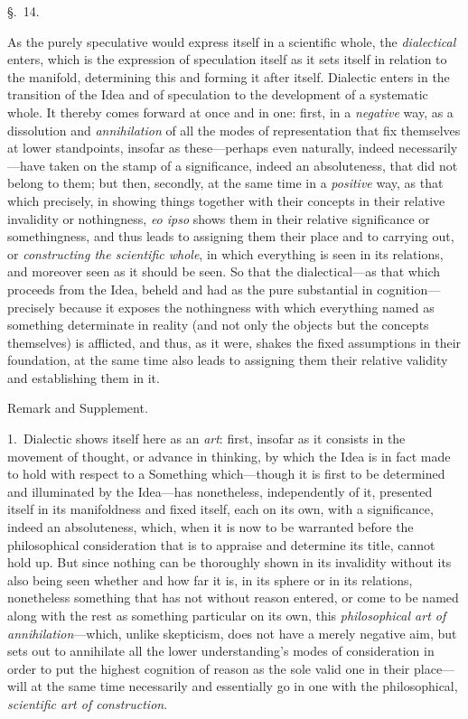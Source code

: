 \documentclass[12pt,a4paper]{book}
\begin{document}
\begin{center}\large\S.~14.\end{center}
As the purely speculative would express itself in a scientific whole, the
\emph{dialectical} enters, which is the expression of speculation itself as it sets
itself in relation to the manifold, determining this and forming it after itself.
Dialectic enters in the transition of the Idea and of speculation to the development
of a systematic whole. It thereby comes forward at once and in one: first, in a
\emph{negative} way, as a dissolution and \emph{annihilation} of all the modes of
representation that fix themselves at lower standpoints, insofar as these---perhaps
even naturally, indeed necessarily---have taken on the stamp of a significance,
indeed an absoluteness, that did not belong to them; but then, secondly, at the same
time in a \emph{positive} way, as that which precisely, in showing things together
with their concepts in their relative invalidity or nothingness, \textit{eo ipso} shows
them in their relative significance or somethingness, and thus leads to assigning them
their place and to carrying out, or \emph{constructing the scientific whole}, in which
everything is seen in its relations, and moreover seen as it should be seen. So that
the dialectical---as that which proceeds from the Idea, beheld and had as the pure
substantial in cognition---precisely because it exposes the nothingness with which
everything named as something determinate in reality (and not only the objects but the
concepts themselves) is afflicted, and thus, as it were, shakes the fixed assumptions
in their foundation, at the same time also leads to assigning them their relative
validity and establishing them in it.

\begin{center}Remark and Supplement.\end{center}
1.~Dialectic shows itself here as an \emph{art}: first, insofar as it consists in the
movement of thought, or advance in thinking, by which the Idea is in fact made to hold
with respect to a Something which---though it is first to be determined and illuminated
by the Idea---has nonetheless, independently of it, presented itself in its
manifoldness and fixed itself, each on its own, with a significance, indeed an
absoluteness, which, when it is now to be warranted before the philosophical
consideration that is to appraise and determine its title, cannot hold up. But since
nothing can be thoroughly shown in its invalidity without its also being seen whether
and how far it is, in its sphere or in its relations, nonetheless something that has not
without reason entered, or come to be named along with the rest as something particular
on its own, this \emph{philosophical art of annihilation}---which, unlike skepticism,
does not have a merely negative aim, but sets out to annihilate all the lower
understanding's modes of consideration in order to put the highest cognition of reason
as the sole valid one in their place---will at the same time necessarily and
essentially go in one with the philosophical, \emph{scientific art of construction}.
\end{document}
